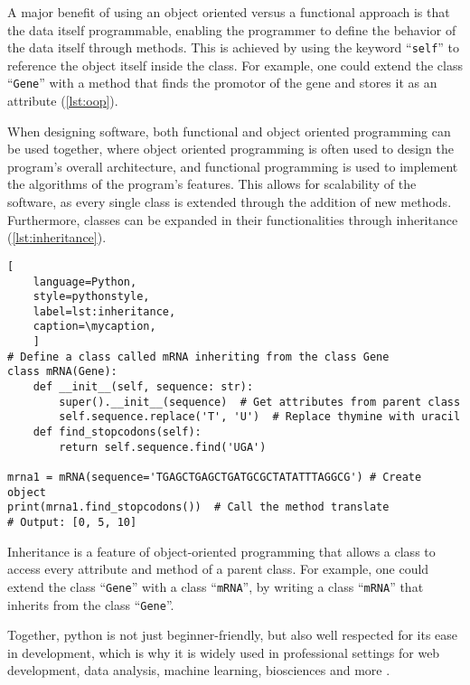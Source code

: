 A major benefit of using an object oriented versus a functional approach is that
the data itself programmable, enabling the programmer to define the behavior of
the data itself through methods. This is achieved by using the keyword
``\texttt{self}'' to reference the object itself inside the class. For example,
one could extend the class ``\texttt{Gene}'' with a method that finds the
promotor of the gene and stores it as an attribute (\autoref{lst:oop}).

When designing software, both functional and object oriented programming can be
used together, where object oriented programming is often used to design the
program's overall architecture, and functional programming is used to implement
the algorithms of the program's features. This allows for scalability of the
software, as every single class is extended through the addition of new methods.
Furthermore, classes can be expanded in their functionalities through
inheritance (\autoref{lst:inheritance}).


\def\mycaption{ Example of inheritance in python.
    The class ``\texttt{mRNA}'' inherits from the class ``\texttt{Gene}''. The class
    ``\texttt{mRNA}'' has two methods, ``\texttt{\_\_init\_\_}'' and
    ``\texttt{find\_stopcodon}''. The method ``\texttt{find\_stopcodon}'' finds the
    position of stop codons. }
\begin{lstlisting}[
    language=Python,
    style=pythonstyle,
    label=lst:inheritance,
    caption=\mycaption,
    ]
# Define a class called mRNA inheriting from the class Gene
class mRNA(Gene):
    def __init__(self, sequence: str):
        super().__init__(sequence)  # Get attributes from parent class
        self.sequence.replace('T', 'U')  # Replace thymine with uracil
    def find_stopcodons(self):
        return self.sequence.find('UGA')

mrna1 = mRNA(sequence='TGAGCTGAGCTGATGCGCTATATTTAGGCG') # Create object
print(mrna1.find_stopcodons())  # Call the method translate
# Output: [0, 5, 10]
\end{lstlisting}

Inheritance is a feature of object-oriented programming that allows
a class to access every attribute and method of a parent class. For example, one
could extend the class ``\texttt{Gene}'' with a class ``\texttt{mRNA}'', by
writing a class ``\texttt{mRNA}'' that inherits from the class ``\texttt{Gene}''.

Together, python is not just beginner-friendly, but also well respected for its
ease in development, which is why it is widely used in professional settings for
web development, data analysis, machine learning, biosciences and more \cite{ekmekciIntroductionProgrammingBioscientists2016}.

